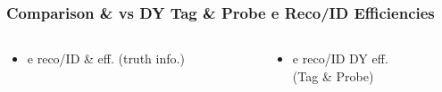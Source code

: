 \documentclass{beamer}
\begin{document}
\begin{frame}
 \frametitle{Comparison \ttbar \& \wpj vs DY Tag \& Probe e Reco/ID Efficiencies}
   \begin{columns}

   \begin{column}{0.33\textwidth}
     \begin{itemize}
   \item e reco/ID \ttbar \& \wpj eff. (truth info.)
  \end{itemize}
   \end{column}
   \begin{column}{0.33\textwidth}
   \begin{itemize}
    \item e reco/ID DY eff. \\(Tag \& Probe)
   \end{itemize}


\end{column}
\end{columns}
\end{frame}
\end{document}
